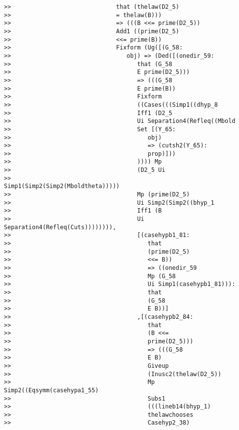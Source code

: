 \documentclass[12pt]{article}
\begin{document}
\begin{verbatim}
>>                              that (thelaw(D2_5)
>>                              = thelaw(B)))
>>                              => (((B <<= prime(D2_5))
>>                              Add1 ((prime(D2_5)
>>                              <<= prime(B))
>>                              Fixform (Ug([(G_58:
>>                                 obj) => (Ded([(onedir_59:
>>                                    that (G_58
>>                                    E prime(D2_5)))
>>                                    => (((G_58
>>                                    E prime(B))
>>                                    Fixform
>>                                    ((Cases(((Simp1((dhyp_8
>>                                    Iff1 (D2_5
>>                                    Ui Separation4(Refleq((Mbold
>>                                    Set [(Y_65:
>>                                       obj)
>>                                       => (cutsh2(Y_65):
>>                                       prop)]))
>>                                    )))) Mp
>>                                    (D2_5 Ui
>>                                    Simp1(Simp2(Simp2(Mboldtheta)))))
>>                                    Mp (prime(D2_5)
>>                                    Ui Simp2(Simp2((bhyp_1
>>                                    Iff1 (B
>>                                    Ui Separation4(Refleq(Cuts)))))))),
>>                                    [(casehypb1_81:
>>                                       that
>>                                       (prime(D2_5)
>>                                       <<= B))
>>                                       => ((onedir_59
>>                                       Mp (G_58
>>                                       Ui Simp1(casehypb1_81))):
>>                                       that
>>                                       (G_58
>>                                       E B))]
>>                                    ,[(casehypb2_84:
>>                                       that
>>                                       (B <<=
>>                                       prime(D2_5)))
>>                                       => (((G_58
>>                                       E B)
>>                                       Giveup
>>                                       (Inusc2(thelaw(D2_5))
>>                                       Mp Simp2((Eqsymm(casehypa1_55)
>>                                       Subs1
>>                                       (((lineb14(bhyp_1)
>>                                       thelawchooses
>>                                       Casehyp2_38)

\end{verbatim}
\end{document}
